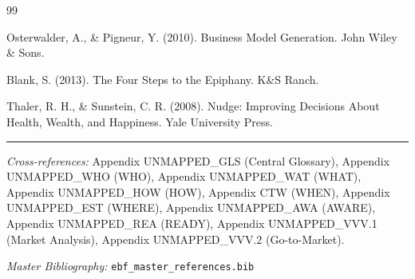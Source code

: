 \begin{thebibliography}{99}

 Osterwalder, A., \& Pigneur, Y. (2010). Business Model Generation. John Wiley \& Sons.

 Blank, S. (2013). The Four Steps to the Epiphany. K\&S Ranch.

 Thaler, R. H., \& Sunstein, C. R. (2008). Nudge: Improving Decisions About Health, Wealth, and Happiness. Yale University Press.

\end{thebibliography}



\vspace{1em}
\hrule
\vspace{0.5em}

\noindent\textit{Cross-references:}
Appendix UNMAPPED_GLS (Central Glossary),
Appendix UNMAPPED_WHO (WHO),
Appendix UNMAPPED_WAT (WHAT),
Appendix UNMAPPED_HOW (HOW),
Appendix CTW (WHEN),
Appendix UNMAPPED_EST (WHERE),
Appendix UNMAPPED_AWA (AWARE),
Appendix UNMAPPED_REA (READY),
Appendix UNMAPPED_VVV.1 (Market Analysis),
Appendix UNMAPPED_VVV.2 (Go-to-Market).

\noindent\textit{Master Bibliography:} \texttt{ebf\_master\_references.bib}


